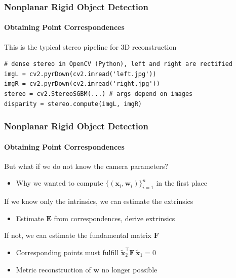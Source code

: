 \documentclass[xetex,professionalfont]{beamer}
\renewcommand{\vec}[1]{\ensuremath{\mathbf{#1}}}
\newcommand{\vw}{\vec{w}}
\newcommand{\vx}{\vec{x}}
\newcommand{\vE}{\vec{E}}
\newcommand{\vF}{\vec{F}}
\renewcommand\emph[1]{\textcolor{tuwcvl_inf_red}{#1}}
\begin{document}

\begin{frame}[fragile]
\frametitle{Nonplanar Rigid Object Detection}
\framesubtitle{Obtaining Point Correspondences}

This is the typical \emph{stereo} pipeline for 3D reconstruction

\bigskip
\begin{verbatim}
# dense stereo in OpenCV (Python), left and right are rectified
imgL = cv2.pyrDown(cv2.imread('left.jpg'))
imgR = cv2.pyrDown(cv2.imread('right.jpg'))
stereo = cv2.StereoSGBM(...) # args depend on images
disparity = stereo.compute(imgL, imgR)
\end{verbatim}

\end{frame}


\begin{frame}
\frametitle{Nonplanar Rigid Object Detection}
\framesubtitle{Obtaining Point Correspondences}

But what if we do not know the camera parameters?
\begin{itemize}
    \item Why we wanted to compute $\{(\vx_i,\vw_i)\}_{i=1}^n$ in the first place
\end{itemize}

\bigskip
If we know only the intrinsics, we can estimate the extrinsics
\begin{itemize}
    \item Estimate $\vE$ from correspondences, derive extrinsics
\end{itemize}

\bigskip
If not, we can estimate the \emph{fundamental matrix} $\vF$
\begin{itemize}
    \item Corresponding points must fulfill $\tilde{\vx}_2^\top\vF\,\tilde{\vx}_1=0$
    \item Metric reconstruction of $\vw$ no longer possible %
\end{itemize}

\end{frame}

\end{document}
